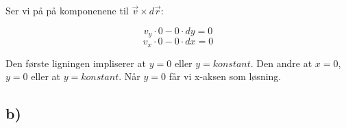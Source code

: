 \documentclass{article}
\begin{document}
\bigskip

\begin{flushleft}
Ser vi på på komponenene til \(\vec{v} \times d\vec{r}\):
\end{flushleft}

\begin{equation*}
v_y \cdot 0 - 0 \cdot dy = 0
\end{equation*}
\begin{equation*}
v_x \cdot 0 - 0 \cdot dx = 0
\end{equation*}

\bigskip

\begin{flushleft}
Den første ligningen impliserer at \(y = 0\) eller \(y = konstant\). Den andre at \(x=0\), \(y = 0\) eller at \(y = konstant\). Når \(y=0\) får vi x-aksen som løsning.
\end{flushleft}

%
%

\subsection*{b)}
\end{document}
